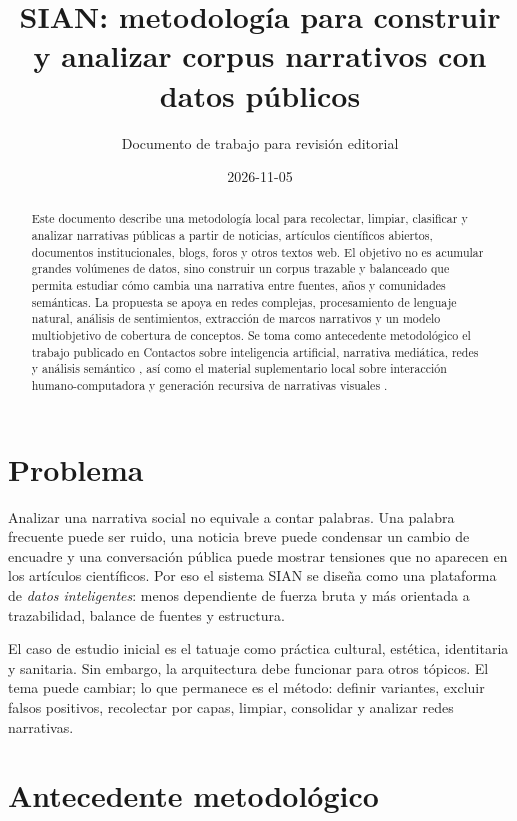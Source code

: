 \documentclass[11pt]{article}
\title{SIAN: metodología para construir y analizar corpus narrativos con datos públicos}
\author{Documento de trabajo para revisión editorial}
\date{2026-11-05}
\begin{document}
\maketitle

\begin{abstract}
Este documento describe una metodología local para recolectar, limpiar, clasificar y analizar narrativas públicas a partir de noticias, artículos científicos abiertos, documentos institucionales, blogs, foros y otros textos web. El objetivo no es acumular grandes volúmenes de datos, sino construir un corpus trazable y balanceado que permita estudiar cómo cambia una narrativa entre fuentes, años y comunidades semánticas. La propuesta se apoya en redes complejas, procesamiento de lenguaje natural, análisis de sentimientos, extracción de marcos narrativos y un modelo multiobjetivo de cobertura de conceptos. Se toma como antecedente metodológico el trabajo publicado en Contactos sobre inteligencia artificial, narrativa mediática, redes y análisis semántico \cite{contactos625}, así como el material suplementario local sobre interacción humano-computadora y generación recursiva de narrativas visuales \cite{frontierssupp}.
\end{abstract}

\section{Problema}

Analizar una narrativa social no equivale a contar palabras. Una palabra frecuente puede ser ruido, una noticia breve puede condensar un cambio de encuadre y una conversación pública puede mostrar tensiones que no aparecen en los artículos científicos. Por eso el sistema SIAN se diseña como una plataforma de \emph{datos inteligentes}: menos dependiente de fuerza bruta y más orientada a trazabilidad, balance de fuentes y estructura.

El caso de estudio inicial es el tatuaje como práctica cultural, estética, identitaria y sanitaria. Sin embargo, la arquitectura debe funcionar para otros tópicos. El tema puede cambiar; lo que permanece es el método: definir variantes, excluir falsos positivos, recolectar por capas, limpiar, consolidar y analizar redes narrativas.

\section{Antecedente metodológico}
\end{document}
